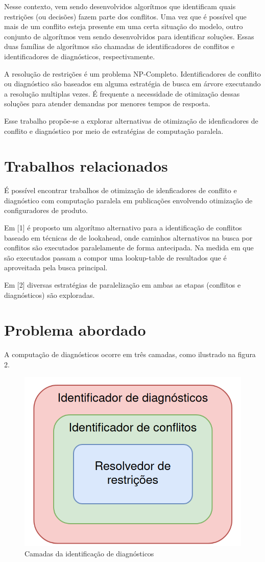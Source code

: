 \documentclass[conference]{IEEEtran}
\begin{document}
Nesse contexto, vem sendo desenvolvidos algorítmos que identificam quais restrições (ou decisões) fazem parte dos conflitos. Uma vez que é possível que mais de um conflito esteja presente em uma certa situação do modelo, outro conjunto de algorítmos vem sendo desenvolvidos para identificar soluções. Essas duas famílias de algorítmos são chamadas de identificadores de conflitos e identificadores de diagnósticos, respectivamente.

A resolução de restrições é um problema NP-Completo. Identificadores de conflito ou diagnóstico são baseados em alguma estratégia de busca em árvore executando a resolução multiplas vezes. É frequente a necessidade de otimização dessas soluções para atender demandas por menores tempos de resposta.

Esse trabalho propõe-se a explorar alternativas de otimização de idenficadores de conflito e diagnóstico por meio de estratégias de computação paralela. 

\section{Trabalhos relacionados}

É possível encontrar trabalhos de otimização de idenficadores de conflito e diagnóstico com computação paralela em publicações envolvendo otimização de configuradores de produto. 

Em [1] é proposto um algorítmo alternativo para a identificação de conflitos baseado em técnicas de de lookahead, onde caminhos alternativos na busca por conflitos são executados paralelamente de forma antecipada. Na medida em que são executados passam a compor uma lookup-table de resultados que é aproveitada pela busca principal.

Em [2] diversas estratégias de paralelização em ambas as etapas (conflitos e diagnósticos) são exploradas. 

\section{Problema abordado}

A computação de diagnósticos ocorre em três camadas, como ilustrado na figura 2.


\begin{figure}[htbp]
\centerline{\includegraphics[width=0.7\columnwidth]{layers.png}}
\caption{Camadas da identificação de diagnósticos} 
\label{fig}
\end{figure}
\end{document}
